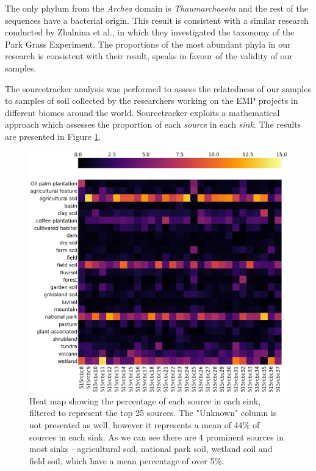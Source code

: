 \documentclass[12pt,twocolumn]{article} %
\begin{document}
\par
The only phylum from the \textit{Archea} domain is \textit{Thaumarchaeota} and the rest of the  sequences have a bacterial origin. This result is consistent with a similar research conducted by Zhalnina et al.\cite{Zhalnina2014}, in which they investigated the taxonomy of the Park Grass Experiment. The proportions of the most abundant phyla in our research is consistent with their result, speaks in favour of the validity of our samples.
\par

The sourcetracker analysis was performed to assess the relatedness of our samples to samples of soil collected by the researchers working on the EMP projects in different biomes around the world. Sourcetracker exploits a mathematical approach which assesses the proportion of each \textit{source} in each \textit{sink}. The results are presented in Figure \ref{fig:sourcetracker_heatmap}. 
\begin{figure}[ht!] %
	\includegraphics[width=\linewidth]{heatmap_perc.png}
	\caption{Heat map showing the percentage of each source in each sink, filtered to represent the top 25 sources. The "Unknown" column is not presented as well, however it represents a mean of 44\% of sources in each sink. As we can see there are 4 prominent sources in most sinks - agricultural soil, national park soil, wetland soil and field soil, which have a mean percentage of over 5\%.}
	\label{fig:sourcetracker_heatmap}
\end{figure}
\end{document}
